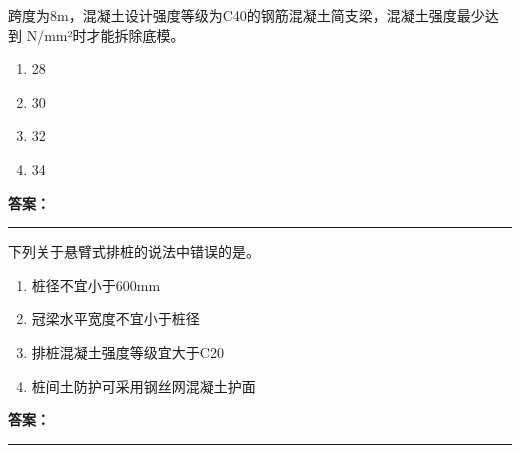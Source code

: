 \documentclass[UTF8,fontset=fandol,11pt]{ctexart}
\newcommand{\answerline}{\textcolor{answerred}{\rule{2.4cm}{0.7pt}}}
\begin{document}
\begin{quizbox}[title={乱序第 179 题｜第四章混凝土结构工程}]

跨度为8m，混凝土设计强度等级为C40的钢筋混凝土简支梁，混凝土强度最少达到 N/mm²时才能拆除底模。\\

\begin{enumerate}[label=\Alph*.]

\item 28

\item 30

\item 32

\item 34

\end{enumerate}

\textbf{\textcolor{answerred}{答案：}} \answerline

\end{quizbox}

\vspace{0.2em}

\begin{quizbox}[title={乱序第 180 题｜第三章基坑工程}]

下列关于悬臂式排桩的说法中错误的是。\\

\begin{enumerate}[label=\Alph*.]

\item 桩径不宜小于600mm

\item 冠梁水平宽度不宜小于桩径

\item 排桩混凝土强度等级宜大于C20

\item 桩间土防护可采用钢丝网混凝土护面

\end{enumerate}

\textbf{\textcolor{answerred}{答案：}} \answerline

\end{quizbox}

\vspace{0.2em}
\end{document}
